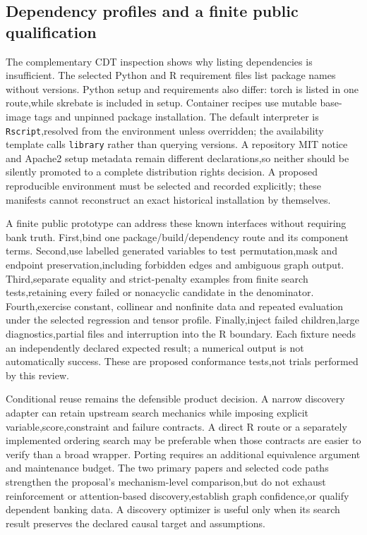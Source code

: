 \subsection{Dependency profiles and a finite public qualification}
The complementary CDT inspection shows why listing dependencies is insufficient. The selected
Python and R requirement files list package names without versions. Python setup and requirements
also differ: torch is listed in one route,while skrebate is included in setup. Container recipes use
mutable base-image tags and unpinned package installation. The default interpreter is
\texttt{Rscript},resolved from the environment unless overridden; the availability template calls
\texttt{library} rather than querying versions. A repository MIT notice and Apache2 setup metadata
remain different declarations,so neither should be silently promoted to a complete distribution
rights decision. A proposed reproducible environment must be selected and recorded explicitly;
these manifests cannot reconstruct an exact historical installation by themselves.
\citep{exec28_rl_cdt}

A finite public prototype can address these known interfaces without requiring bank truth.
First,bind one package/build/dependency route and its component terms. Second,use labelled
generated variables to test permutation,mask and endpoint preservation,including forbidden edges
and ambiguous graph output. Third,separate equality and strict-penalty examples from finite search
tests,retaining every failed or nonacyclic candidate in the denominator. Fourth,exercise constant,
collinear and nonfinite data and repeated evaluation under the selected regression and tensor
profile. Finally,inject failed children,large diagnostics,partial files and interruption into the
R boundary. Each fixture needs an independently declared expected result; a numerical output is
not automatically success. These are proposed conformance tests,not trials performed by this review.

Conditional reuse remains the defensible product decision. A narrow discovery adapter can retain
upstream search mechanics while imposing explicit variable,score,constraint and failure contracts.
A direct R route or a separately implemented ordering search may be preferable when those
contracts are easier to verify than a broad wrapper. Porting requires an additional equivalence
argument and maintenance budget. The two primary papers and selected code paths strengthen the
proposal's mechanism-level comparison,but do not exhaust reinforcement or attention-based
discovery,establish graph confidence,or qualify dependent banking data.
A discovery optimizer is useful only when its search result preserves the declared causal target and assumptions.
